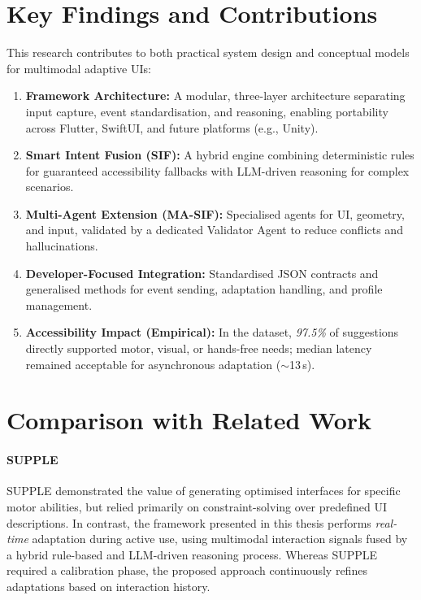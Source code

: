 \section{Key Findings and Contributions}
This research contributes to both practical system design and conceptual models for multimodal adaptive UIs:
\begin{enumerate}
    \item \textbf{Framework Architecture:} A modular, three-layer architecture separating input capture, event standardisation, and reasoning, enabling portability across Flutter, SwiftUI, and future platforms (e.g., Unity).
    \item \textbf{Smart Intent Fusion (SIF):} A hybrid engine combining deterministic rules for guaranteed accessibility fallbacks with LLM-driven reasoning for complex scenarios.
    \item \textbf{Multi-Agent Extension (MA-SIF):} Specialised agents for UI, geometry, and input, validated by a dedicated Validator Agent to reduce conflicts and hallucinations.
    \item \textbf{Developer-Focused Integration:} Standardised JSON contracts and generalised methods for event sending, adaptation handling, and profile management.
    \item \textbf{Accessibility Impact (Empirical):} In the dataset, \textit{97.5\%} of suggestions directly supported motor, visual, or hands-free needs; median latency remained acceptable for asynchronous adaptation ($\sim$13\,s).
\end{enumerate}

\section{Comparison with Related Work}

\paragraph{SUPPLE \cite{Gajos2008SUPPLE}}
SUPPLE demonstrated the value of generating optimised interfaces for specific motor abilities, but relied primarily on constraint-solving over predefined UI descriptions. In contrast, the framework presented in this thesis performs \emph{real-time} adaptation during active use, using multimodal interaction signals fused by a hybrid rule-based and LLM-driven reasoning process. Whereas SUPPLE required a calibration phase, the proposed approach continuously refines adaptations based on interaction history.

